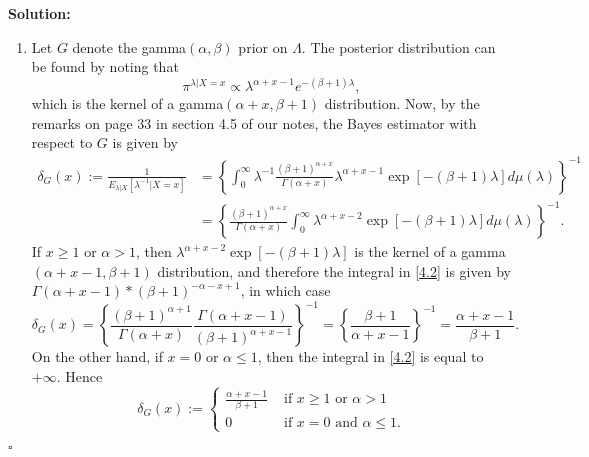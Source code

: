 \documentclass[12pt]{article}
\newcounter{ProofCounter}
\newenvironment{Solution}{\stepcounter{ProofCounter}\textbf{Solution:}}{\hfill$\square$}
\begin{document}
\begin{Solution}
\begin{enumerate}[label=(\alph*)]
  \item Let $G$ denote the gamma$(\alpha, \beta)$ prior on $\Lambda$. The posterior distribution can be found by noting that 
    \[ \pi^{\lambda|X=x} \propto \lambda^{\alpha + x - 1}e^{-(\beta + 1)\lambda}, \]
    which is the kernel of a gamma$(\alpha + x, \beta + 1)$ distribution. Now,
    by the remarks on page 33 in section 4.5 of our notes, the Bayes estimator with
    respect to $G$ is given by 
    \begin{align}
      \delta_{G}(x) := \frac{1}{E_{\lambda|X}[\lambda^{-1}|X=x]} & = \left\{ \int_{0}^{\infty}\lambda^{-1} \frac{(\beta + 1)^{\alpha +
        x}}{\Gamma(\alpha + x)} \lambda^{\alpha + x - 1}\exp\left[ -(\beta + 1)\lambda \right]d\mu(\lambda) \right\}^{-1} \nonumber \\
        & = \left\{ \frac{(\beta+1)^{\alpha + x}}{\Gamma(\alpha + x)} \int_{0}^{\infty} \lambda^{\alpha + x - 2}\exp\left[ -(\beta+1)\lambda
        \right]d\mu(\lambda) \right\}^{-1}. \label{4.2}
    \end{align}
    If $x \geq 1$ or $\alpha > 1$, then $\lambda^{\alpha + x -2}\exp\left[ -(\beta + 1)\lambda \right]$ is the kernel of a gamma$(\alpha + x - 1,
    \beta + 1)$ distribution, and therefore the integral in \eqref{4.2} is given by $\Gamma(\alpha + x - 1) * (\beta + 1)^{-\alpha - x + 1}$,
    in which case 
    \[
      \delta_{G}(x) = \left\{ \frac{(\beta+1)^{\alpha + 1}}{\Gamma(\alpha + x)} \frac{\Gamma(\alpha + x - 1)}{(\beta + 1)^{\alpha + x - 1}}
        \right\}^{-1} = \left\{ \frac{\beta + 1}{\alpha + x - 1} \right\}^{-1} = \frac{\alpha + x - 1}{\beta + 1}.
    \]
    On the
    other hand, if $x = 0$ or $\alpha \leq 1$, then the integral in \eqref{4.2} is equal to $+\infty$. Hence 
    \begin{equation}
      \delta_{G}(x) := \left\{ \begin{array}{cl}
          \frac{\alpha + x - 1}{\beta + 1} & \text{ if } x \geq 1 \text{ or } \alpha > 1 \\
          0 & \text{ if } x = 0 \text{ and } \alpha \leq 1. 
      \end{array}\right.
      \label{4.3}
    \end{equation}



\end{enumerate}
\end{Solution}
\end{document}
